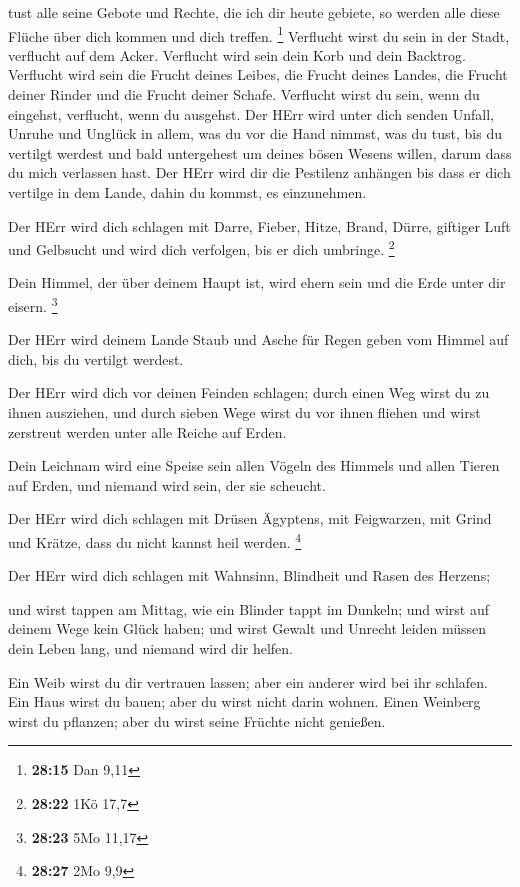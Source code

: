 tust alle seine Gebote und Rechte, die ich dir heute gebiete, so werden
alle diese Flüche über dich kommen und dich treffen. \footnote{\textbf{28:15}
  Dan 9,11}  Verflucht wirst du sein in der Stadt,
verflucht auf dem Acker.  Verflucht wird sein dein Korb und
dein Backtrog.  Verflucht wird sein die Frucht deines
Leibes, die Frucht deines Landes, die Frucht deiner Rinder und die
Frucht deiner Schafe.  Verflucht wirst du sein, wenn du
eingehst, verflucht, wenn du ausgehst.  Der HErr wird unter
dich senden Unfall, Unruhe und Unglück in allem, was du vor die Hand
nimmst, was du tust, bis du vertilgt werdest und bald untergehest um
deines bösen Wesens willen, darum dass du mich verlassen hast.
 Der HErr wird dir die Pestilenz anhängen bis dass er dich
vertilge in dem Lande, dahin du kommst, es einzunehmen.

 Der HErr wird dich schlagen mit Darre, Fieber, Hitze,
Brand, Dürre, giftiger Luft und Gelbsucht und wird dich verfolgen, bis
er dich umbringe. \footnote{\textbf{28:22} 1Kö 17,7}

 Dein Himmel, der über deinem Haupt ist, wird ehern sein
und die Erde unter dir eisern. \footnote{\textbf{28:23} 5Mo 11,17}

 Der HErr wird deinem Lande Staub und Asche für Regen geben
vom Himmel auf dich, bis du vertilgt werdest.

 Der HErr wird dich vor deinen Feinden schlagen; durch
einen Weg wirst du zu ihnen ausziehen, und durch sieben Wege wirst du
vor ihnen fliehen und wirst zerstreut werden unter alle Reiche auf
Erden.

 Dein Leichnam wird eine Speise sein allen Vögeln des
Himmels und allen Tieren auf Erden, und niemand wird sein, der sie
scheucht.

 Der HErr wird dich schlagen mit Drüsen Ägyptens, mit
Feigwarzen, mit Grind und Krätze, dass du nicht kannst heil werden.
\footnote{\textbf{28:27} 2Mo 9,9}

 Der HErr wird dich schlagen mit Wahnsinn, Blindheit und
Rasen des Herzens;

 und wirst tappen am Mittag, wie ein Blinder tappt im
Dunkeln; und wirst auf deinem Wege kein Glück haben; und wirst Gewalt
und Unrecht leiden müssen dein Leben lang, und niemand wird dir helfen.

 Ein Weib wirst du dir vertrauen lassen; aber ein anderer
wird bei ihr schlafen. Ein Haus wirst du bauen; aber du wirst nicht
darin wohnen. Einen Weinberg wirst du pflanzen; aber du wirst seine
Früchte nicht genießen.

